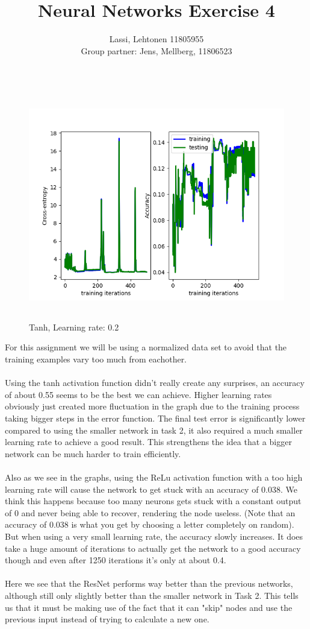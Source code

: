 \documentclass[a4paper]{article}
\title{Neural Networks Exercise 4}
\author{Lassi, Lehtonen 11805955\\
		Group partner: Jens, Mellberg, 11806523}
\begin{document}
\maketitle

   \begin{figure}[h]
\caption{Tanh, Learning rate: 0.2}
\centering
\includegraphics[width=12cm, height=10cm]{LR02.png}
\end{figure}

For this assignment we will be using a normalized data set to avoid that the training examples vary too much from eachother.\\\\
Using the tanh activation function didn't really create any surprises, an accuracy of about 0.55 seems to be the best we can achieve. Higher learning rates obviously just created more fluctuation in the graph due to the training process taking bigger steps in the error function. The final test error is significantly lower compared to using the smaller network in task 2, it also required a much smaller learning rate to achieve a good result. This strengthens the idea that a bigger network can be much harder to train efficiently. \\\\
Also as we see in the graphs, using the ReLu activation function with a too high learning rate will cause the network to get stuck with an accuracy of 0.038. We think this happens because too many neurons gets stuck with a constant output of 0 and never being able to recover, rendering the node useless. (Note that an accuracy of 0.038 is what you get by choosing a letter completely on random). But when using a very small learning rate, the accuracy slowly increases. It does take a huge amount of iterations to actually get the network to a good accuracy though and even after 1250 iterations it's only at about 0.4.\\\\
Here we see that the ResNet performs way better than the previous networks, although still only slightly better than the smaller network in Task 2. This tells us that it must be making use of the fact that it can "skip" nodes and use the previous input instead of trying to calculate a new one. 
\end{document}
